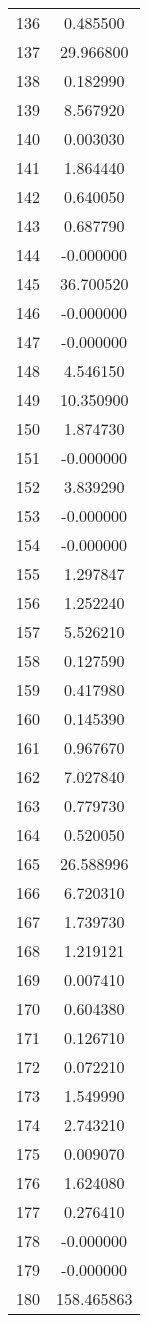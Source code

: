 \documentclass[12pt]{article}
\begin{document}
\begin{longtable}{@{}cc@{}}
136 & 0.485500 \\
137 & 29.966800 \\
138 & 0.182990 \\
139 & 8.567920 \\
140 & 0.003030 \\
141 & 1.864440 \\
142 & 0.640050 \\
143 & 0.687790 \\
144 & -0.000000 \\
145 & 36.700520 \\
146 & -0.000000 \\
147 & -0.000000 \\
148 & 4.546150 \\
149 & 10.350900 \\
150 & 1.874730 \\
151 & -0.000000 \\
152 & 3.839290 \\
153 & -0.000000 \\
154 & -0.000000 \\
155 & 1.297847 \\
156 & 1.252240 \\
157 & 5.526210 \\
158 & 0.127590 \\
159 & 0.417980 \\
160 & 0.145390 \\
161 & 0.967670 \\
162 & 7.027840 \\
163 & 0.779730 \\
164 & 0.520050 \\
165 & 26.588996 \\
166 & 6.720310 \\
167 & 1.739730 \\
168 & 1.219121 \\
169 & 0.007410 \\
170 & 0.604380 \\
171 & 0.126710 \\
172 & 0.072210 \\
173 & 1.549990 \\
174 & 2.743210 \\
175 & 0.009070 \\
176 & 1.624080 \\
177 & 0.276410 \\
178 & -0.000000 \\
179 & -0.000000 \\
180 & 158.465863 \\

\end{longtable}
\end{document}
